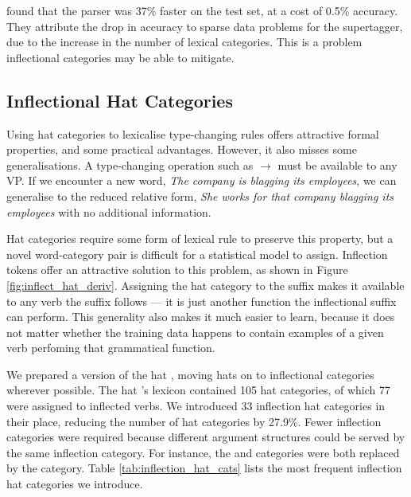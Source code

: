 \documentclass[11pt]{article}
\begin{document}
\citet{honnibal:09} found that the parser was 37\% faster on the test set,
at a cost of 0.5\% accuracy. They attribute the drop in accuracy to sparse
data problems for the supertagger, due to the increase in the number of
lexical categories. This is a problem inflectional categories may be able to
mitigate.

\subsection{Inflectional Hat Categories}

Using hat categories to lexicalise type-changing rules offers attractive formal
properties, and some practical advantages. However, it also misses some generalisations.
A type-changing operation such as  $\rightarrow$ 
must be available to any VP. If we encounter a new word,
\emph{The company is blagging its employees}, we can generalise to the reduced
relative form, \emph{She works for that company blagging its employees} with
no additional information.

Hat categories require some form of lexical rule to preserve this property,
but a novel word-category pair is difficult for a statistical model to assign.
Inflection tokens offer an attractive solution to this problem, as shown in
Figure \ref{fig:inflect_hat_deriv}. Assigning the hat category to the suffix
makes it available to any verb the suffix follows --- it is just another function the
inflectional suffix can perform. This generality also makes it much easier to
learn, because it does not matter whether the training data happens to contain
examples of a given verb perfoming that grammatical function.

We prepared a version of the \citet{honnibal:09} hat \ccgbank, moving hats on
to inflectional categories wherever possible. The hat \ccgbank's lexicon contained 105
hat categories, of which 77 were assigned to inflected verbs. We introduced
33 inflection hat categories in their place, reducing the number of hat
categories by 27.9\%. Fewer inflection categories were
required because different argument structures could be served by the same inflection
category. For instance, the  and 
categories were both replaced by the  category.
Table \ref{tab:inflection_hat_cats} lists the most frequent inflection hat categories
we introduce.
\end{document}

